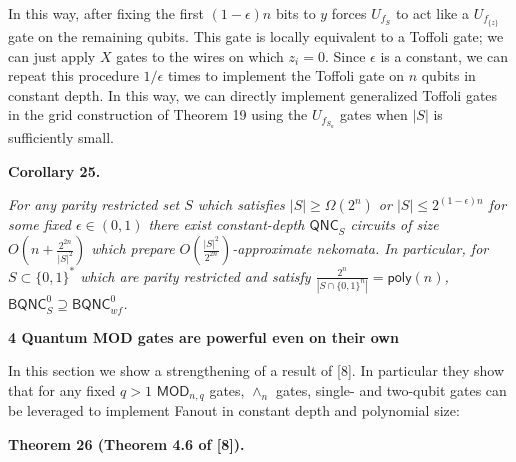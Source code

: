 In this way, after fixing the first $(1-\epsilon)n$ bits to $y$ forces $U_{f_{S}}$ to act like a $U_{f_{\{z\}}}$ gate on the remaining qubits. This gate is locally equivalent to a Toffoli gate; we can just apply $X$ gates to the wires on which $z_{i}=0$. Since $\epsilon$ is a constant, we can repeat this procedure $1/\epsilon$ times to implement the Toffoli gate on $n$ qubits in constant depth. In this way, we can directly implement generalized Toffoli gates in the grid construction of Theorem 19 using the $U_{f_{S_{n}}}$ gates when $|S|$ is sufficiently small.\par





\par\medskip\noindent\textbf{
\textbf{Corollary 25}\textbf{.}
}\par



\emph{For any parity restricted set $S$ which satisfies $|S|\geq\Omega(2^{n})$ or $|S|\leq 2^{(1-\epsilon)n}$ for some fixed $\epsilon\in(0,1)$ there exist constant-depth ${\mathsf{QNC}}_{S}$ circuits of size $O(n+\frac{2^{2n}}{|S|^{2}})$ which prepare $O(\frac{|S|^{2}}{2^{2n}})$-approximate nekomata. In particular, for $S\subset\{0,1\}^{*}$ which are parity restricted and satisfy $\frac{2^{n}}{|S\cap\{0,1\}^{n}|}={\mathsf{poly}}(n)$, ${\mathsf{BQNC}}^{0}_{S}\supseteq{\mathsf{BQNC}}^{0}_{wf}$.}\par









\par\medskip\noindent\textbf{
4 Quantum MOD gates are powerful even on their own}\par




In this section we show a strengthening of a result of [8]. In particular they show that for any fixed $q>1$ $\mathsf{MOD}_{n,q}$ gates, $\wedge_{n}$ gates, single- and two-qubit gates can be leveraged to implement Fanout in constant depth and polynomial size:\par





\par\medskip\noindent\textbf{
\textbf{Theorem 26}\textbf{ }(Theorem 4.6 of [8])\textbf{.}
}\par



